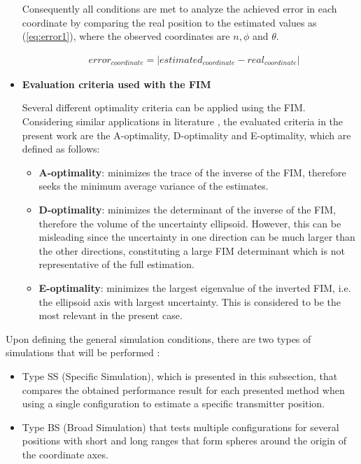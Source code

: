 \begin{itemize}
	Consequently all conditions are met to analyze the achieved error in each coordinate by comparing the real position to the estimated values as (\ref{eq:error1}), where the observed coordinates are $n, \phi$ and $\theta$.
	
	\begin{eqnarray}
		&error_{coordinate} = |estimated_{coordinate} - real_{coordinate}|
		\label{eq:error1}
	\end{eqnarray}
	
	\item \textbf{Evaluation criteria used with the FIM}
	
	Several different optimality criteria can be applied using the FIM. Considering similar applications in literature \cite{optimality-e-a-d}, the evaluated criteria in the present work are the A-optimality, D-optimality and E-optimality, which are defined as follows:
	
	\begin{itemize}
		\item \textbf{A-optimality}: minimizes the trace of the inverse of the FIM, therefore seeks the minimum average variance of the estimates.
		\item \textbf{D-optimality}: minimizes the determinant of the inverse of the FIM, therefore the volume of the uncertainty ellipsoid. However, this can be misleading since the uncertainty in one direction can be much larger than the other directions, constituting a large FIM determinant which is not representative of the full estimation.
		\item \textbf{E-optimality}: minimizes the largest eigenvalue of the inverted FIM, i.e. the ellipsoid axis with largest uncertainty. This is considered to be the most relevant in the present case.
	\end{itemize}
	
\end{itemize}

Upon defining the general simulation conditions, there are two types of simulations that will be performed :
\begin{itemize}
	\item Type SS (Specific Simulation), which is presented in this subsection, that compares the obtained performance result for each presented method when using a single configuration to estimate a specific transmitter position.
	\item Type BS (Broad Simulation) that tests multiple configurations for several positions with short and long ranges that form spheres around the origin of the coordinate axes.
\end{itemize}


